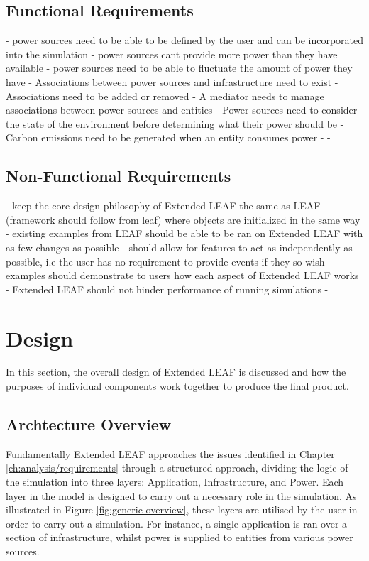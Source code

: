 \documentclass{l4proj}
\begin{document}
\section{Functional Requirements}
- power sources need to be able to be defined by the user and can be incorporated into the simulation
- power sources cant provide more power than they have available
- power sources need to be able to fluctuate the amount of power they have
- Associations between power sources and infrastructure need to exist
- Associations need to be added or removed
- A mediator needs to manage associations between power sources and entities
- Power sources need to consider the state of the environment before determining what their power should be
- Carbon emissions need to be generated when an entity consumes power
-
-
\section{Non-Functional Requirements}
- keep the core design philosophy of Extended LEAF the same as LEAF (framework should follow from leaf) where objects are initialized in the same way
- existing examples from LEAF should be able to be ran on Extended LEAF with as few changes as possible
- should allow for features to act as independently as possible, i.e the user has no requirement to provide events if they so wish
- examples should demonstrate to users how each aspect of Extended LEAF works
- Extended LEAF should not hinder performance of running simulations
-


\chapter{Design}\label{ch:design}

In this section, the overall design of Extended LEAF is discussed and how the purposes of individual components work together to produce the final product.


\section{Archtecture Overview}\label{sec:architecture-overview}
Fundamentally Extended LEAF approaches the issues identified in Chapter \ref{ch:analysis/requirements} through a structured approach, dividing the logic of the simulation into three layers: Application, Infrastructure, and Power.
Each layer in the model is designed to carry out a necessary role in the simulation.
As illustrated in Figure \ref{fig:generic-overview}, these layers are utilised by the user in order to carry out a simulation.
For instance, a single application is ran over a section of infrastructure, whilst power is supplied to entities from various power sources.
\end{document}
